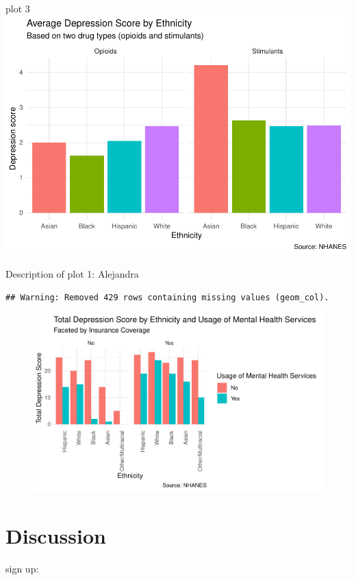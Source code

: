 \documentclass[man]{apa6}
\begin{document}
plot 3
\includegraphics{Final_Paper_Group_3_files/figure-latex/ST_plott-1.pdf}

Description of plot 1: Alejandra

\begin{verbatim}
## Warning: Removed 429 rows containing missing values (geom_col).
\end{verbatim}

\begin{figure}
\centering
\includegraphics{Final_Paper_Group_3_files/figure-latex/plot1-1.pdf}
\caption{}
\end{figure}

\section{Discussion}\label{discussion}

sign up:
\end{document}
